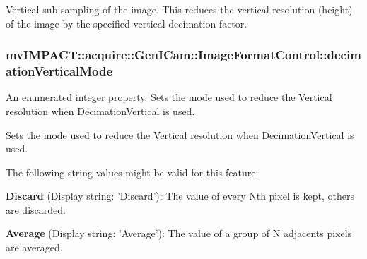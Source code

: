 Vertical sub-\/sampling of the image. This reduces the vertical resolution (height) of the image by the specified vertical decimation factor. \hypertarget{classmv_i_m_p_a_c_t_1_1acquire_1_1_gen_i_cam_1_1_image_format_control_a81098f47bf7166c3b8abb47fde14ed85}{
\subsubsection[{decimation\+Vertical\+Mode}]{ mv\+I\+M\+P\+A\+C\+T\+::acquire\+::\+Gen\+I\+Cam\+::\+Image\+Format\+Control\+::decimation\+Vertical\+Mode}}\label{classmv_i_m_p_a_c_t_1_1acquire_1_1_gen_i_cam_1_1_image_format_control_a81098f47bf7166c3b8abb47fde14ed85}


An enumerated integer property. Sets the mode used to reduce the Vertical resolution when Decimation\+Vertical is used. 

Sets the mode used to reduce the Vertical resolution when Decimation\+Vertical is used.

The following string values might be valid for this feature\+:
\begin{DoxyItemize}
\item {\bfseries Discard} (Display string\+: 'Discard')\+: The value of every Nth pixel is kept, others are discarded.
\item {\bfseries Average} (Display string\+: 'Average')\+: The value of a group of N adjacents pixels are averaged.
\end{DoxyItemize}

